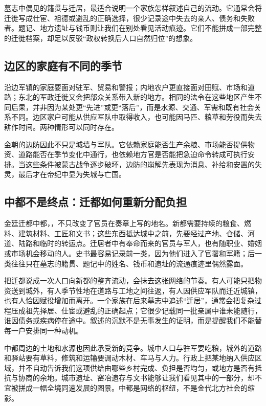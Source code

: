 墓志中偶见的籍贯与迁居，最适合说明一个家族怎样叙述自己的流动。它通常会将迁徙写成仕宦、祖德或避乱的正确选择，很少记录途中失去的亲人、债务和失败者。题记、地方遗址与钱币则让我们在别处看见活动痕迹。它们不能拼成一部完整的迁徙档案，却足以反驳“政权转换后人口自然归位”的想象。

\subsection{边区的家庭有不同的季节}

沿边军镇的家庭要面对驻军、贸易和警报；内地农户更直接面对田赋、市场和道路；东北的军政迁徙又会把部众关系带入新的地方。相同的法令在这些地区产生不同后果，并非因为某处更“先进”或更“落后”，而是水源、交通、军需和既有社会关系不同。边区家户可能从供应军队中取得收入，也可能因马匹、粮草和劳役而失去耕作时间。两种情形可以同时存在。

金朝的边防因此不只是城墙与军队。它依赖家庭能否生产余粮、市场能否提供物资、道路能否在季节变化中通行，也依赖地方官是否能把急迫命令转成可执行安排。当这些条件被蒙古战争逐步破坏，边防的崩解先表现为消息、补给和安置的失灵，最后才在帝纪中显为失城与亡国。

\subsection{中都不是终点：迁都如何重新分配负担}

金廷迁都中都，，不只改变了官员在奏章上写的地名。新都需要持续的粮食、燃料、建筑材料、工匠和文书；这些东西抵达城中之前，先要经过产地、仓储、河道、陆路和临时的转运点。迁居者中有奉命而来的官员与军人，也有随职业、婚姻或市场机会移动的人。史书最容易记录前一类，因为他们进入了官署和军籍；后一类往往只在墓志的籍贯、题记中的姓名、钱币和遗址的流通痕迹里偶然露面。

把迁都说成一次人口向新都的整齐流动，会抹去这张网络的节奏。有人可能只把物资送到城外，有人季节性地在道路与工地之间往返，有人因供应军队而迁近城镇，也有人恰因赋役增加而离开。一个家族在后来墓志中追述“迁居”，通常会把复杂过程压成祖先择居、仕宦或避乱的正确起点；它很少记载同一批亲属中谁未能随行，谁因债务或疾病停在途中。叙述的沉默不是无事发生的证明，而是提醒我们不能替每一户安排同一种动机。

中都周边的土地和水源也因此承受新的竞争。城中人口与驻军要吃粮，城外的道路和驿站要有草料，修筑和运输要调动木材、车马与人力。行政上把某地纳入供应区域，并不自动告诉我们这项供给由哪些乡村完成、负担是否均匀，或地方是否有抵抗与协商的余地。城市遗址、窑冶遗存与文书能够让我们看见其中的一部分，却不宜被拼成一幅全境同速发展的图景。中都是网络的枢纽，不是金代北方社会的缩影。


